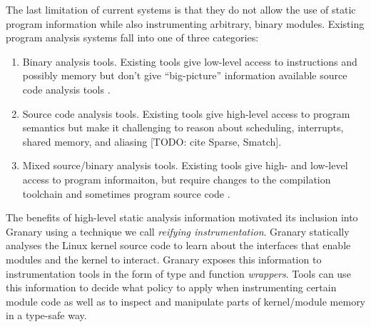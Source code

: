 \documentclass[letterpaper,twocolumn,10pt]{article}
\begin{document}
The last limitation of current systems is that they do not allow the use of static program information while also instrumenting arbitrary, binary modules.  Existing program analysis systems fall into one of three categories:
\begin{enumerate}
	\item Binary analysis tools. Existing tools give low-level access to instructions and possibly memory but don't give ``big-picture'' information available source code analysis tools \cite{DRK,DynamoRIO,Pin,PinOS,QEMU,Valgrind}.
	\item Source code analysis tools. Existing tools give high-level access to program semantics but make it challenging to reason about scheduling, interrupts, shared memory, and aliasing [TODO: cite Sparse, Smatch].
	\item Mixed source/binary analysis tools. Existing tools give high- and low-level access to program informaiton, but require changes to the compilation toolchain and sometimes program source code \cite{NaCl,AddressSanitizer,ThreadSanitizer}.
\end{enumerate}


The benefits of high-level static analysis information motivated its inclusion into Granary using a technique we call \emph{reifying instrumentation}. Granary statically analyses the Linux kernel source code to learn about  the interfaces that enable modules and the kernel to interact. Granary exposes this information to instrumentation tools in the form of type and function \emph{wrappers}. Tools can use this information to decide what policy to apply when instrumenting certain module code as well as to inspect and manipulate parts of kernel/module memory in a type-safe way.
\end{document}
